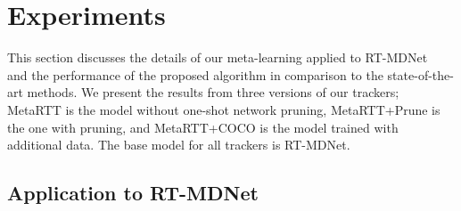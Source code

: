 \documentclass[letterpaper]{article} %
\def \Ainit{\mathcal{A}_\text{init}}
\def \Aonline{\mathcal{A}_\text{on}}
\def \Kinit{K_\text{init}}
\def \Konline{K_\text{on}}
\begin{document}
\fi


\newcommand{\rowgroup}[1]{\hspace{-0em}#1}



\section{Experiments}
\label{sec:experiments}

This section discusses the details of our meta-learning applied to RT-MDNet~\cite{jung2018realtime} and the performance of the proposed algorithm in comparison to the state-of-the-art methods.
We present the results from three versions of our trackers; MetaRTT is the model without one-shot network pruning, MetaRTT+Prune is the one with pruning, and MetaRTT+COCO is the model trained with additional data. 
The base model for all trackers is RT-MDNet.


\subsection{Application to RT-MDNet}
\end{document}
